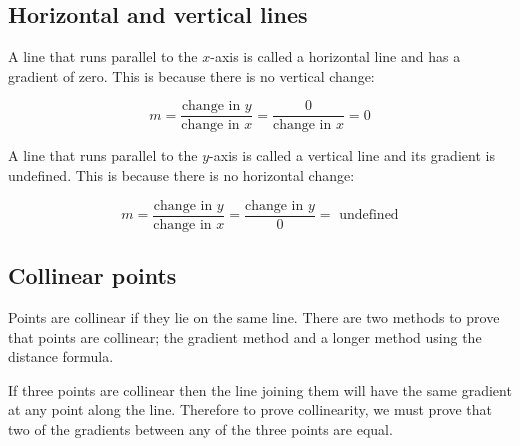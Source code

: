 \subsection*{Horizontal and vertical lines}

A line that runs parallel to the $x$-axis is called a horizontal line and has a gradient of zero. This is
because there is no vertical change:\par
\begin{equation*}m = \dfrac{\mbox{change in }y}{\mbox{change in }x} = \dfrac{0}{\mbox{change in }x} =0\end{equation*}

A line that runs parallel to the $y$-axis is called a vertical line and its gradient is undefined. This is because there is no horizontal change:\par
\begin{equation*}m = \dfrac{\mbox{change in }y}{\mbox{change in }x} = \dfrac{\mbox{change in }y}{0}=\mbox{ undefined}\end{equation*} \par

\subsection*{Collinear points}

Points are collinear if they lie on the same line. There are two methods to prove that points are collinear; the gradient method and a
longer method using the distance formula.

If three points are collinear then the line joining them will have the same gradient at any point along the line.
Therefore to prove collinearity, we must prove that two of the gradients between any of the three points are
equal.

